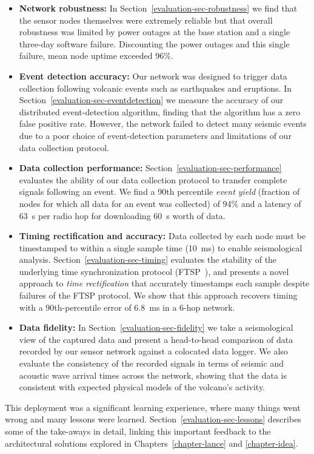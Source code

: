 \begin{itemize}

\item \textbf{Network robustness:} In Section~\ref{evaluation-sec-robustness}
we find that the sensor nodes themselves were extremely reliable but that
overall robustness was limited by power outages at the base station and a
single three-day software failure. Discounting the power outages and this
single failure, mean node uptime exceeded 96\%.

\item \textbf{Event detection accuracy:} Our network was designed to trigger
data collection following volcanic events such as earthquakes and eruptions.
In Section~\ref{evaluation-sec-eventdetection} we measure the accuracy of our
distributed event-detection algorithm, finding that the algorithm has a zero
false positive rate. However, the network failed to detect many seismic
events due to a poor choice of event-detection parameters and limitations of
our data collection protocol.

\item \textbf{Data collection performance:}
Section~\ref{evaluation-sec-performance} evaluates the ability of our data
collection protocol to transfer complete signals following an event. We find
a 90th percentile \textit{event yield} (fraction of nodes for which all data
for an event was collected) of 94\% and a latency of 63~s per radio hop for
downloading 60~s worth of data.

\item \textbf{Timing rectification and accuracy:} Data collected by each node
must be timestamped to within a single sample time (10~ms) to enable
seismological analysis. Section~\ref{evaluation-sec-timing} evaluates the
stability of the underlying time synchronization protocol (FTSP~\cite{ftsp}),
and presents a novel approach to \textit{time rectification} that accurately
timestamps each sample despite failures of the FTSP protocol. We show that
this approach recovers timing with a 90th-percentile error of 6.8~ms in a
6-hop network.

\item \textbf{Data fidelity:} In Section~\ref{evaluation-sec-fidelity} we
take a seismological view of the captured data and present a head-to-head
comparison of data recorded by our sensor network against a colocated data
logger. We also evaluate the consistency of the recorded signals in terms of
seismic and acoustic wave arrival times across the network, showing that the
data is consistent with expected physical models of the volcano's activity.

\end{itemize}

This deployment was a significant learning experience, where many things went
wrong and many lessons were learned. Section~\ref{evaluation-sec-lessons}
describes some of the take-aways in detail, linking this important feedback
to the architectural solutions explored in Chapters~\ref{chapter-lance} and
\ref{chapter-idea}.
